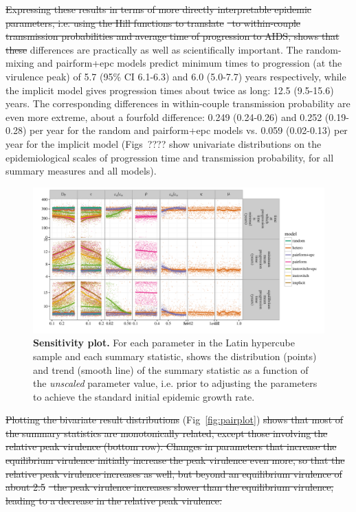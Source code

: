 \documentclass[10pt,letterpaper]{article}
\renewcommand{\figurename}{Fig}
\newcommand{\Lspvl}{$\log_{10}$ SPVL}
\newcommand{\todo}[1]{\textbf{#1}} %
\providecommand{\DIFaddtex}[1]{{\protect\color{blue}\uwave{#1}}} %
\providecommand{\DIFdeltex}[1]{{\protect\color{red}\sout{#1}}}                      %
\providecommand{\DIFaddbegin}{} %
\providecommand{\DIFaddend}{} %
\providecommand{\DIFdelbegin}{} %
\providecommand{\DIFdelend}{} %
\providecommand{\DIFadd}[1]{\texorpdfstring{\DIFaddtex{#1}}{#1}} %
\providecommand{\DIFdel}[1]{\texorpdfstring{\DIFdeltex{#1}}{}} %
\newcommand{\DIFscaledelfig}{0.5}
\newlength{\DIFdelgraphicswidth} %
\newlength{\DIFdelgraphicsheight} %
\newcommand{\DIFaddincludegraphics}[2][]{{\color{blue}\fbox{\DIFOincludegraphics[#1]{#2}}}} %
\newcommand{\DIFdelincludegraphics}[2][]{%
\sbox{\DIFdelgraphicsbox}{\DIFOincludegraphics[#1]{#2}}%
\settoboxwidth{\DIFdelgraphicswidth}{\DIFdelgraphicsbox} %
\settoboxtotalheight{\DIFdelgraphicsheight}{\DIFdelgraphicsbox} %
\scalebox{\DIFscaledelfig}{%
\parbox[b]{\DIFdelgraphicswidth}{\usebox{\DIFdelgraphicsbox}\\[-\baselineskip] \rule{\DIFdelgraphicswidth}{0em}}\llap{\resizebox{\DIFdelgraphicswidth}{\DIFdelgraphicsheight}{%
\setlength{\unitlength}{\DIFdelgraphicswidth}%
\begin{picture}(1,1)%
\thicklines\linethickness{2pt} %
{\color[rgb]{1,0,0}\put(0,0){\framebox(1,1){}}}%
{\color[rgb]{1,0,0}\put(0,0){\line( 1,1){1}}}%
{\color[rgb]{1,0,0}\put(0,1){\line(1,-1){1}}}%
\end{picture}%
}\hspace*{3pt}}} %
} %
\DeclareRobustCommand{\DIFaddbegin}{\DIFOaddbegin \let\includegraphics\DIFaddincludegraphics} %
\DeclareRobustCommand{\DIFaddend}{\DIFOaddend \let\includegraphics\DIFOincludegraphics} %
\DeclareRobustCommand{\DIFdelbegin}{\DIFOdelbegin \let\includegraphics\DIFdelincludegraphics} %
\DeclareRobustCommand{\DIFdelend}{\DIFOaddend \let\includegraphics\DIFOincludegraphics} %
\begin{document}
\DIFdelbegin \DIFdel{Expressing these results in terms of more directly interpretable epidemic
parameters, i.e. using the Hill functions to translate }%
\DIFdel{\ to
within-couple transmission probabilities and average time of progression
to AIDS, shows that these }\DIFdelend \DIFaddbegin \DIFadd{These }\DIFaddend differences are practically as well as 
scientifically important. The random-mixing and pairform+epc models
predict minimum times to progression (at the virulence peak) of
5.7 (95\% CI 6.1-6.3) and 6.0 (5.0-7.7) years respectively, while
the implicit model gives progression times about twice as long:
12.5 (9.5-15.6) years. The corresponding differences in 
within-couple transmission
probability are even more extreme, about a fourfold difference:
0.249 (0.24-0.26) and 0.252 (0.19-0.28) per year for the 
random and pairform+epc models vs. 0.059 (0.02-0.13) per year
for the implicit model (Figs~???? \DIFaddbegin \DIFadd{\todo{fill in!} }\DIFaddend show univariate distributions
on the epidemiological scales
of progression time and transmission probability,
for all summary measures and all models).

\begin{figure}[!ht]
\includegraphics[width=\textwidth]{../figures/fig5.pdf}
\caption{{\bf Sensitivity plot.}
For each parameter in the Latin hypercube sample and each summary statistic, shows the distribution (points) and trend (smooth line) of the summary statistic as a function of the \emph{unscaled} parameter value, i.e. prior to adjusting the parameters to achieve the standard initial epidemic growth rate.}
\label{fig:plot_sens}
\end{figure}

\DIFdelbegin \DIFdel{Plotting the bivariate result distributions }\DIFdelend \DIFaddbegin \DIFadd{The bivariate relationships }\DIFaddend (\figurename~\ref{fig:pairplot}) \DIFdelbegin \DIFdel{shows that most of the summary statistics
are monotonically related, except those involving the relative peak virulence
(bottom row). Changes in parameters that increase the equilibrium
virulence initially increase the peak virulence even more, so
that the relative peak virulence increases as well, but beyond
an equilibrium virulence of about 2.5 }%
\DIFdel{\ the peak virulence
increases slower than the equilibrium virulence, leading to a
decrease in the relative peak virulence.
}%
\end{document}
